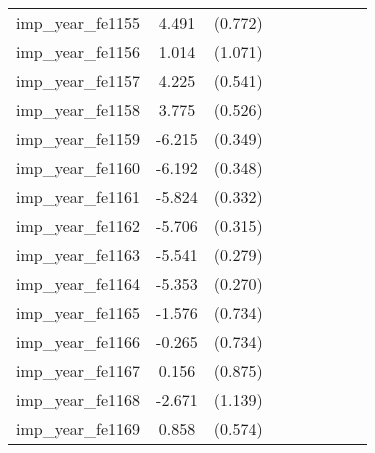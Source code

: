 {\begin{tabular}{l*{4}{cc}}
imp\_year\_fe1155&    4.491\sym{***}&  (0.772)&                  &         &                  &         &                  &         \\
imp\_year\_fe1156&    1.014         &  (1.071)&                  &         &                  &         &                  &         \\
imp\_year\_fe1157&    4.225\sym{***}&  (0.541)&                  &         &                  &         &                  &         \\
imp\_year\_fe1158&    3.775\sym{***}&  (0.526)&                  &         &                  &         &                  &         \\
imp\_year\_fe1159&   -6.215\sym{***}&  (0.349)&                  &         &                  &         &                  &         \\
imp\_year\_fe1160&   -6.192\sym{***}&  (0.348)&                  &         &                  &         &                  &         \\
imp\_year\_fe1161&   -5.824\sym{***}&  (0.332)&                  &         &                  &         &                  &         \\
imp\_year\_fe1162&   -5.706\sym{***}&  (0.315)&                  &         &                  &         &                  &         \\
imp\_year\_fe1163&   -5.541\sym{***}&  (0.279)&                  &         &                  &         &                  &         \\
imp\_year\_fe1164&   -5.353\sym{***}&  (0.270)&                  &         &                  &         &                  &         \\
imp\_year\_fe1165&   -1.576\sym{*}  &  (0.734)&                  &         &                  &         &                  &         \\
imp\_year\_fe1166&   -0.265         &  (0.734)&                  &         &                  &         &                  &         \\
imp\_year\_fe1167&    0.156         &  (0.875)&                  &         &                  &         &                  &         \\
imp\_year\_fe1168&   -2.671\sym{*}  &  (1.139)&                  &         &                  &         &                  &         \\
imp\_year\_fe1169&    0.858         &  (0.574)&                  &         &                  &         &                  &         \\

\end{tabular}}
